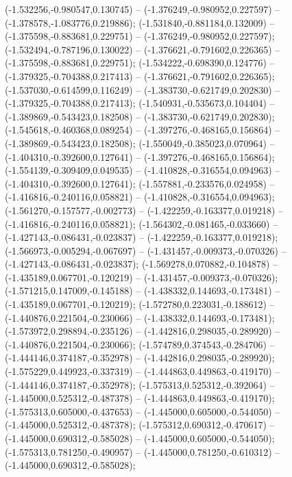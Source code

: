  (-1.532256,-0.980547,0.130745) -- (-1.376249,-0.980952,0.227597) -- (-1.378578,-1.083776,0.219886);
 (-1.531840,-0.881184,0.132009) -- (-1.375598,-0.883681,0.229751) -- (-1.376249,-0.980952,0.227597);
 (-1.532494,-0.787196,0.130022) -- (-1.376621,-0.791602,0.226365) -- (-1.375598,-0.883681,0.229751);
 (-1.534222,-0.698390,0.124776) -- (-1.379325,-0.704388,0.217413) -- (-1.376621,-0.791602,0.226365);
 (-1.537030,-0.614599,0.116249) -- (-1.383730,-0.621749,0.202830) -- (-1.379325,-0.704388,0.217413);
 (-1.540931,-0.535673,0.104404) -- (-1.389869,-0.543423,0.182508) -- (-1.383730,-0.621749,0.202830);
 (-1.545618,-0.460368,0.089254) -- (-1.397276,-0.468165,0.156864) -- (-1.389869,-0.543423,0.182508);
 (-1.550049,-0.385023,0.070964) -- (-1.404310,-0.392600,0.127641) -- (-1.397276,-0.468165,0.156864);
 (-1.554139,-0.309409,0.049535) -- (-1.410828,-0.316554,0.094963) -- (-1.404310,-0.392600,0.127641);
 (-1.557881,-0.233576,0.024958) -- (-1.416816,-0.240116,0.058821) -- (-1.410828,-0.316554,0.094963);
 (-1.561270,-0.157577,-0.002773) -- (-1.422259,-0.163377,0.019218) -- (-1.416816,-0.240116,0.058821);
 (-1.564302,-0.081465,-0.033660) -- (-1.427143,-0.086431,-0.023837) -- (-1.422259,-0.163377,0.019218);
 (-1.566973,-0.005294,-0.067697) -- (-1.431457,-0.009373,-0.070326) -- (-1.427143,-0.086431,-0.023837);
 (-1.569278,0.070882,-0.104878) -- (-1.435189,0.067701,-0.120219) -- (-1.431457,-0.009373,-0.070326);
 (-1.571215,0.147009,-0.145188) -- (-1.438332,0.144693,-0.173481) -- (-1.435189,0.067701,-0.120219);
 (-1.572780,0.223031,-0.188612) -- (-1.440876,0.221504,-0.230066) -- (-1.438332,0.144693,-0.173481);
 (-1.573972,0.298894,-0.235126) -- (-1.442816,0.298035,-0.289920) -- (-1.440876,0.221504,-0.230066);
 (-1.574789,0.374543,-0.284706) -- (-1.444146,0.374187,-0.352978) -- (-1.442816,0.298035,-0.289920);
 (-1.575229,0.449923,-0.337319) -- (-1.444863,0.449863,-0.419170) -- (-1.444146,0.374187,-0.352978);
 (-1.575313,0.525312,-0.392064) -- (-1.445000,0.525312,-0.487378) -- (-1.444863,0.449863,-0.419170);
 (-1.575313,0.605000,-0.437653) -- (-1.445000,0.605000,-0.544050) -- (-1.445000,0.525312,-0.487378);
 (-1.575312,0.690312,-0.470617) -- (-1.445000,0.690312,-0.585028) -- (-1.445000,0.605000,-0.544050);
 (-1.575313,0.781250,-0.490957) -- (-1.445000,0.781250,-0.610312) -- (-1.445000,0.690312,-0.585028);
